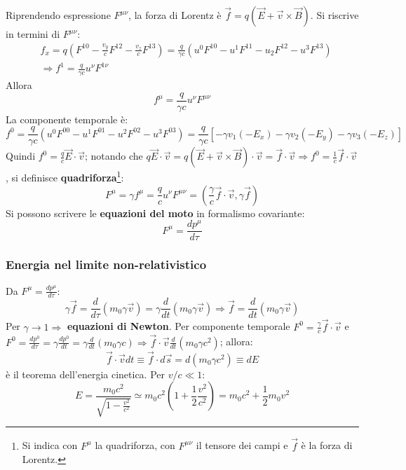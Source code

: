 \documentclass[a4paper]{scrartcl}
\numberwithin{equation}{subsection}
\theoremstyle{style1}
\begin{document}
Riprendendo espressione $F^{\mu \nu} $, la forza di Lorentz \`e $\vec{f}= q (\vec{E}+ \vec{v}\times \vec{B})$. Si riscrive in termini di $F^{\mu \nu} $:
\[
	\begin{split}
		&f_x = q \left(F^{1 0} - \frac{v_y}{c}F^{12} - \frac{v_z}{c}F^{13}\right)  = \frac{q}{\gamma c} (u^0 F^{10} - u^1 F^{11}  - u_2 F^{12} - u^3 F^{13} ) \\
		&\Rightarrow f^1 = \frac{q}{\gamma c}u^\nu F^{1 \nu} 
	\end{split}
\] 
Allora
\begin{equation}
	f^\mu  = \frac{q}{\gamma c} u^\nu F^{\mu  \nu} 
\end{equation}
La componente temporale \`e:
\[
f^0 = \frac{q}{\gamma c } \left(u^0 F^{00} - u^1 F^{01} - u^2 F^{02} - u^3F^{03}    \right) = \frac{q}{\gamma c}\left[ - \gamma v_1 ( -E_x) - \gamma v_2(-E_y) - \gamma v_3 ( -E_z) \right]
\] 
Quindi $f^0 =\frac{q}{c} \vec{E}\cdot \vec{v}$; notando che $q \vec{E}\cdot \vec{v}= q(\vec{E}+ \vec{v}\times \vec{B}) \cdot \vec{v}= \vec{f}\cdot \vec{v}\Rightarrow f^0 = \frac{1}{c}\vec{f}\cdot \vec{v}$, si definisce \textbf{quadriforza}\footnote{Si indica con $F^\mu $ la quadriforza, con $F^{\mu  \nu} $ il tensore dei campi e $\vec{f}$ \`e la forza di Lorentz.}:
\begin{equation}
	F^\mu  = \gamma f^\mu  = \frac{q}{c}u^\nu F^{\mu  \nu} = \left(\frac{\gamma}{c} \vec{f}\cdot \vec{v}, \gamma\vec{f}\right)  
\end{equation}
Si possono scrivere le \textbf{equazioni del moto} in formalismo covariante:
\begin{equation}
	F^\mu  = \frac{d p^\mu }{d \tau } 
\end{equation}
\subsubsection{Energia nel limite non-relativistico}
Da $F^\mu  =  \frac{d p^\mu }{d \tau } $:
\[
\gamma\vec{f}= \frac{d }{d \tau } (m_0\gamma\vec{v}) = \gamma \frac{d }{d t} (m_0\gamma\vec{v})\Rightarrow \vec{f}=\frac{d }{d t} (m_0\gamma\vec{v})
\] 
Per $\gamma\to 1 \Rightarrow $ \textbf{equazioni di Newton}. Per componente temporale $F^0 = \frac{\gamma}{c}\vec{f}\cdot \vec{v}$ e $F^0= \frac{d p^0}{d \tau } = \gamma\frac{d p^0}{d t} = \gamma\frac{d }{d t} (m_0\gamma c) \Rightarrow \vec{f}\cdot \vec{v} \frac{d }{d t} (m_0\gamma c^2)$; allora:
\begin{equation}
	\vec{f}\cdot \vec{v} dt \equiv \vec{f}\cdot d\vec{s} = d(m_0\gamma c^2) \equiv dE
\end{equation}
\`e il teorema dell'energia cinetica. Per $v / c \ll 1$:
\begin{equation}
	E = \frac{m_0 c^2}{\sqrt{1- \frac{v^2}{c^2}} }\simeq m_0c^2 \left(1 + \frac{1}{2}\frac{v^2 }{c^2}\right)   = m_0c^2 + \frac{1}{2}m_0v^2
\end{equation}
\end{document}
